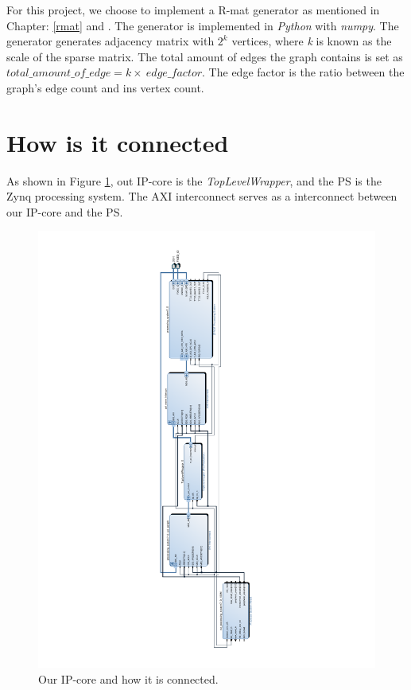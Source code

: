 For this project, we choose to implement a R-mat generator as mentioned in Chapter: \ref{rmat} and  \cite{Rmat2004}. The generator is implemented in \textit{Python} \cite{PYTHON} with \textit{numpy}. The generator generates adjacency matrix with $2^k$ vertices, where \textit{k} is known as the scale of the sparse matrix. The total amount of edges the graph contains is set as $total\_amount\_of\_edge = k \times\ edge\_factor $. The edge factor is the ratio between the graph's edge count and ins vertex count\cite{graph500}.



\section{How is it connected}
As shown in Figure \ref{fig:vivadoImple}, out IP-core is the \textit{TopLevelWrapper}, and the PS is the Zynq processing system. The AXI interconnect serves as a interconnect between our IP-core and the PS.

\begin{figure}[!ht]
\includegraphics[scale=0.7]{Figures/design_1}
\caption{Our IP-core and how it is connected.}
\label{fig:vivadoImple}
\end{figure}



